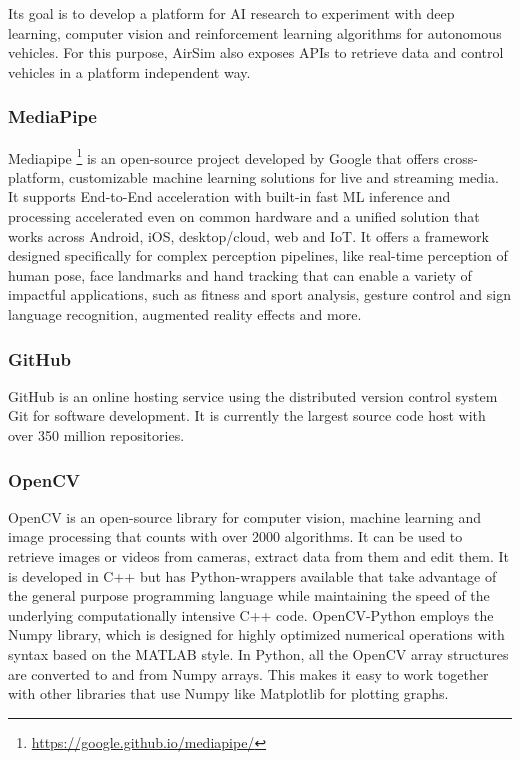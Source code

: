 Its goal is to develop a platform for AI research to experiment with deep learning, computer vision and reinforcement learning algorithms for autonomous vehicles. For this purpose, AirSim also exposes APIs to retrieve data and control vehicles in a platform independent way.

\subsubsection{MediaPipe}
\label{subsec:mediapipe}
Mediapipe \footnote{\url{https://google.github.io/mediapipe/}} is an open-source project developed by Google that offers cross-platform, customizable machine learning solutions for live and streaming media.
It supports End-to-End acceleration with built-in fast ML inference and processing accelerated even on common hardware and a unified solution that works across Android, iOS, desktop/cloud, web and IoT.
It offers a framework designed specifically for complex perception pipelines, like real-time perception of human pose, face landmarks and hand tracking that can enable a variety of impactful applications, such as fitness and sport analysis, gesture control and sign language recognition, augmented reality effects and more.


\subsubsection{GitHub}
\label{subsec:github}
GitHub is an online hosting service using the distributed version control system Git for software development. It is currently the largest source code host with over 350 million repositories.


\subsubsection{OpenCV}
\label{subsec:opencv}
OpenCV is an open-source library for computer vision, machine learning and image processing that counts with over 2000 algorithms. 
It can be used to retrieve images or videos from cameras, extract data from them and edit them.
It is developed in C++ but has Python-wrappers available that take advantage of the general purpose programming language while maintaining the speed of the underlying computationally intensive C++ code.
OpenCV-Python employs the Numpy library, which is designed for highly optimized numerical operations with syntax based on the MATLAB style.
In Python, all the OpenCV array structures are converted to and from Numpy arrays. 
This makes it easy to work together with other libraries that use Numpy like Matplotlib for plotting graphs.


